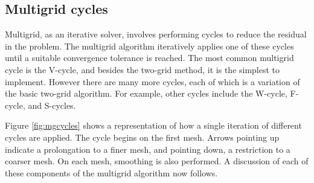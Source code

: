 \subsection{Multigrid cycles}

Multigrid, as an iterative solver, involves performing cycles to reduce the residual in the problem.
The multigrid algorithm iteratively applies one of these cycles until a suitable convergence tolerance is reached.
The most common multigrid cycle is the V-cycle, and besides the two-grid method, it is the simplest to implement.
However there are many more cycles, each of which is a variation of the basic two-grid algorithm.
For example, other cycles include the W-cycle, F-cycle, and S-cycles.

Figure \ref{fig:mgcycles} shows a representation of how a single iteration of different cycles are applied.
The cycle begins on the first mesh.
Arrows pointing up indicate a prolongation to a finer mesh, and pointing down, a restriction to a coarser mesh.
On each mesh, smoothing is also performed.
A discussion of each of these components of the multigrid algorithm now follows.


